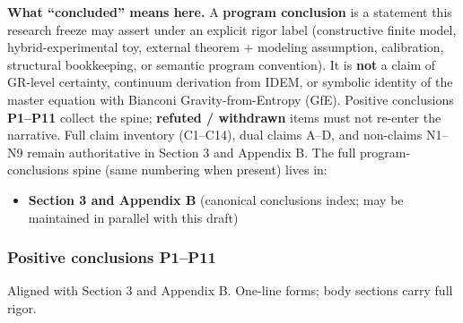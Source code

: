 \documentclass[
  11pt,
]{article}
\providecommand{\tightlist}{%
  \setlength{\itemsep}{0pt}\setlength{\parskip}{0pt}}
\begin{document}
\textbf{What ``concluded'' means here.} A \textbf{program conclusion} is
a statement this research freeze may assert under an explicit rigor
label (constructive finite model, hybrid-experimental toy, external
theorem + modeling assumption, calibration, structural bookkeeping, or
semantic program convention). It is \textbf{not} a claim of GR-level
certainty, continuum derivation from IDEM, or symbolic identity of the
master equation with Bianconi Gravity-from-Entropy (GfE). Positive
conclusions \textbf{P1--P11} collect the spine; \textbf{refuted /
withdrawn} items must not re-enter the narrative. Full claim inventory
(C1--C14), dual claims A--D, and non-claims N1--N9 remain authoritative
in Section 3 and Appendix B. The full program-conclusions spine (same
numbering when present) lives in:

\begin{itemize}
\tightlist
\item
  \textbf{Section 3 and Appendix B} (canonical conclusions index; may be
  maintained in parallel with this draft)
\end{itemize}

\subsubsection{Positive conclusions
P1--P11}\label{positive-conclusions-p1p11}

Aligned with Section 3 and Appendix B. One-line forms; body sections
carry full rigor.
\end{document}
